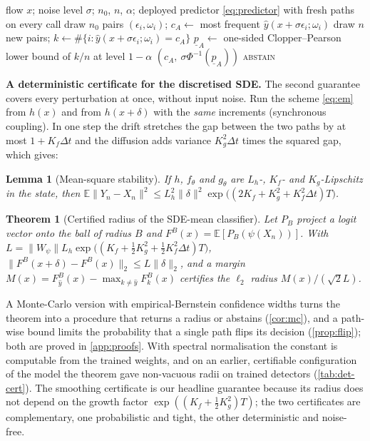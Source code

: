 \documentclass{article}
\newtheorem{theorem}{Theorem}
\newtheorem{lemma}{Lemma}
\theoremstyle{definition}
\newcommand{\Exp}{\mathbb{E}}
\begin{document}
\begin{algorithm}[t]
\caption{\textsc{CertifySmoothed}$(x)$ for the stochastic detector}
\label{alg:certify}
\begin{algorithmic}[1]
\REQUIRE flow $x$; noise level $\sigma$; $n_0$, $n$, $\alpha$; deployed predictor \eqref{eq:predictor} with fresh paths on every call
\STATE draw $n_0$ pairs $(\epsilon_i,\omega_i)$; $c_A\leftarrow$ most frequent $\hat y(x+\sigma\epsilon_i;\omega_i)$ \hfill{}
\STATE draw $n$ new pairs; $k\leftarrow\#\{i:\hat y(x+\sigma\epsilon_i;\omega_i)=c_A\}$ \hfill{}
\STATE $\underline p_A\leftarrow$ one-sided Clopper--Pearson lower bound of $k/n$ at level $1-\alpha$
 \RETURN $(c_A,\ \sigma\Phi^{-1}(\underline p_A))$ \ELSE \RETURN \textsc{abstain} \ENDIF
\end{algorithmic}
\end{algorithm}


\textbf{A deterministic certificate for the discretised SDE.} The second
guarantee covers every perturbation at once, without input noise. Run the scheme
\eqref{eq:em} from $h(x)$ and from $h(x+\delta)$ with the \emph{same} increments
(synchronous coupling). In one step the drift stretches the gap between the two
paths by at most $1+K_f\Delta t$ and the diffusion adds variance $K_g^2\Delta t$
times the squared gap, which gives:

\begin{lemma}[Mean-square stability]\label{lem:ms}
If $h$, $f_\theta$ and $g_\theta$ are $L_h$-, $K_f$- and $K_g$-Lipschitz in the
state, then $\Exp\|Y_n-X_n\|^2\le L_h^2\|\delta\|^2\exp\bigl((2K_f+K_g^2+K_f^2\Delta t)T\bigr)$.
\end{lemma}

\begin{theorem}[Certified radius of the SDE-mean classifier]\label{thm:mean-cert}
Let $P_B$ project a logit vector onto the ball of radius $B$ and
$F^B(x)=\Exp[P_B(\psi(X_n))]$. With
$L=\|W_\psi\|L_h\exp\bigl((K_f+\tfrac12K_g^2+\tfrac12K_f^2\Delta t)T\bigr)$,
$\|F^B(x+\delta)-F^B(x)\|_2\le L\|\delta\|_2$, and a margin
$M(x)=F^B_{\hat y}(x)-\max_{k\ne\hat y}F^B_k(x)$ certifies the $\ell_2$ radius
$M(x)/(\sqrt2L)$.
\end{theorem}

A Monte-Carlo version with empirical-Bernstein confidence widths turns the
theorem into a procedure that returns a radius or abstains (\cref{cor:mc}), and
a path-wise bound limits the probability that a single path flips its decision
(\cref{prop:flip}); both are proved in \cref{app:proofs}. With spectral
normalisation the constant is computable from the trained weights, and on an
earlier, certifiable configuration of the model the theorem gave non-vacuous
radii on trained detectors (\cref{tab:det-cert}). The smoothing certificate is
our headline guarantee because its radius does not depend on the growth factor
$\exp((K_f+\frac12K_g^2)T)$; the two certificates are complementary, one
probabilistic and tight, the other deterministic and noise-free.
\end{document}
